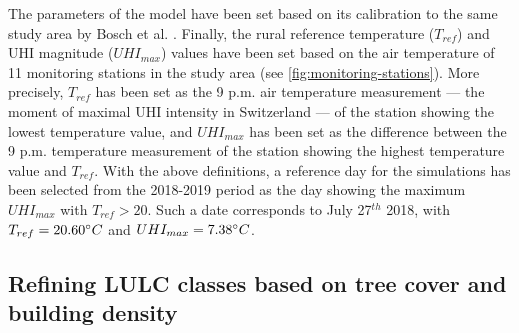 \documentclass[10pt,letterpaper]{article}
\begin{document}

The parameters of the model have been set based on its calibration to the same study area by Bosch et al. \cite{bosch2020spatially}.
Finally, the rural reference temperature ($T_{ref}$) and UHI magnitude ($UHI_{max}$) values have been set based on the air temperature of 11 monitoring stations in the study area (see \autoref{fig:monitoring-stations}). More precisely, $T_{ref}$ has been set as the 9 p.m. air temperature measurement --- the moment of maximal UHI intensity in Switzerland \cite{burgst2019representing} --- of the station showing the lowest temperature value, and $UHI_{max}$ has been set as the difference between the 9 p.m. temperature measurement of the station showing the highest temperature value and $T_{ref}$.
With the above definitions, a reference day for the simulations has been selected from the 2018-2019 period as the day showing the maximum $UHI_{max}$ with $T_{ref} > 20$. Such a date corresponds to July 27$^{th}$ 2018, with $T_{ref} = 20.60 \degree C$ and $UHI_{max} = 7.38 \degree C$.


\subsection*{Refining LULC classes based on tree cover and building density}
\label{sec:refin-lulc-class}
\end{document}
